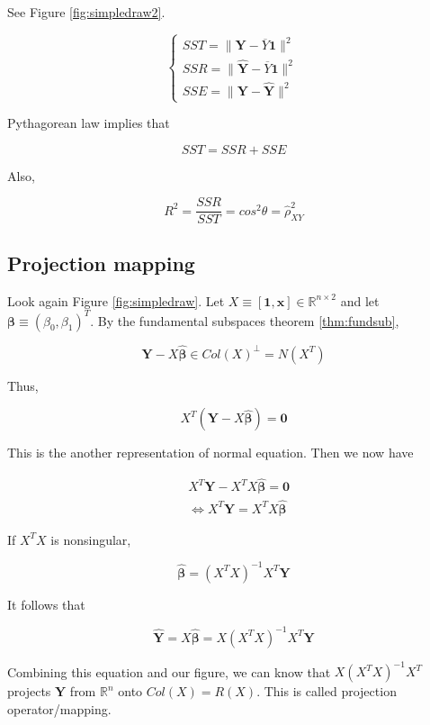 \documentclass[]{book}
\theoremstyle{definition}
\theoremstyle{definition}
\theoremstyle{definition}
\theoremstyle{remark}
\begin{document}
See Figure \ref{fig:simpledraw2}.

\[
\begin{cases}
  SST = \lVert \mathbf{Y} - \overline{Y} \mathbf{1} \rVert^2 \\
  SSR = \lVert \mathbf{\hat{Y}} - \overline{Y} \mathbf{1} \rVert^2 \\
  SSE = \lVert \mathbf{Y} - \mathbf{\hat{Y}} \rVert^2
\end{cases}
\]

Pythagorean law implies that

\[SST = SSR + SSE\]

Also,

\[R^2 = \frac{SSR}{SST} = cos^2\theta = \hat\rho_{XY}^2\]

\hypertarget{solproj}{%
\subsection{Projection mapping}\label{solproj}}

Look again Figure \ref{fig:simpledraw}. Let \(X \equiv [\mathbf{1}, \mathbf{x}] \in \mathbb{R}^{n \times 2}\) and let \(\boldsymbol\beta \equiv (\beta_0, \beta_1)^T\). By the fundamental subspaces theorem \ref{thm:fundsub},

\[\mathbf{Y} - X\boldsymbol{\hat\beta} \in Col(X)^{\perp} = N(X^T)\]

Thus,

\begin{equation}
  X^T(\mathbf{Y} - X\boldsymbol{\hat\beta}) = \mathbf{0}
  \label{eq:projeq}
\end{equation}

This is the another representation of normal equation. Then we now have

\begin{equation*}
  \begin{split}
    & X^T\mathbf{Y} - X^TX\boldsymbol{\hat\beta} = \mathbf{0} \\
    & \Leftrightarrow X^T\mathbf{Y} = X^TX\boldsymbol{\hat\beta}
  \end{split}
\end{equation*}

If \(X^TX\) is nonsingular,

\[\boldsymbol{\hat\beta} = (X^TX)^{-1}X^T \mathbf{Y}\]

It follows that

\[\mathbf{\hat{Y}} = X\boldsymbol{\hat\beta} = X(X^TX)^{-1}X^T \mathbf{Y}\]

Combining this equation and our figure, we can know that \(X(X^TX)^{-1}X^T\) projects \(\mathbf{Y}\) from \(\mathbb{R}^n\) onto \(Col(X) = R(X)\). This is called projection operator/mapping.
\end{document}
